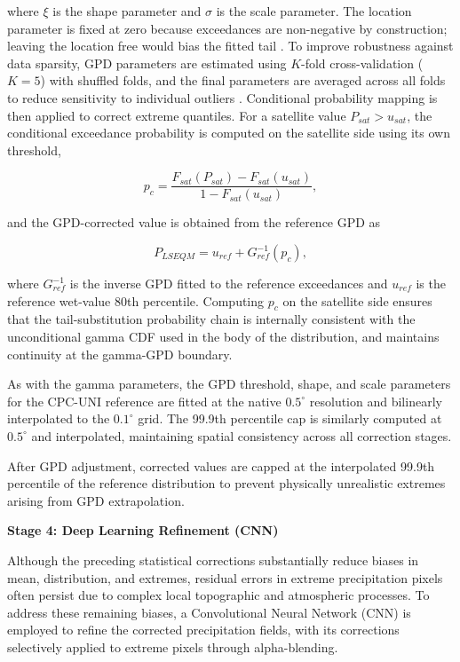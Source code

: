\documentclass[
]{article}
\begin{document}
where \(\xi\) is the shape parameter and \(\sigma\) is the scale
parameter. The location parameter is fixed at zero because exceedances
are non-negative by construction; leaving the location free would bias
the fitted tail \cite{ref7}. To improve robustness against data sparsity,
GPD parameters are estimated using \(K\)-fold cross-validation
(\(K = 5\)) with shuffled folds, and the final parameters are averaged
across all folds to reduce sensitivity to individual outliers \cite{ref25}.
Conditional probability mapping is then applied to correct extreme
quantiles. For a satellite value \(P_{sat} > u_{sat}\), the conditional
exceedance probability is computed on the satellite side using its own
threshold,

\[p_c = \frac{F_{sat}(P_{sat}) - F_{sat}(u_{sat})}{1 - F_{sat}(u_{sat})},\]

and the GPD-corrected value is obtained from the reference GPD as

\[P_{LSEQM} = u_{ref} + G_{ref}^{-1}(p_c),\]

where \(G_{ref}^{-1}\) is the inverse GPD fitted to the reference
exceedances and \(u_{ref}\) is the reference wet-value 80th percentile.
Computing \(p_c\) on the satellite side ensures that the
tail-substitution probability chain is internally consistent with the
unconditional gamma CDF used in the body of the distribution, and
maintains continuity at the gamma-GPD boundary.

As with the gamma parameters, the GPD threshold, shape, and scale
parameters for the CPC-UNI reference are fitted at the native
\(0.5^{\circ}\) resolution and bilinearly interpolated to the
\(0.1^{\circ}\) grid. The 99.9th percentile cap is similarly computed at
\(0.5^{\circ}\) and interpolated, maintaining spatial consistency across
all correction stages.

After GPD adjustment, corrected values are capped at the interpolated
99.9th percentile of the reference distribution to prevent physically
unrealistic extremes arising from GPD extrapolation.

\textbf{Stage 4: Deep Learning Refinement (CNN)}

Although the preceding statistical corrections substantially reduce
biases in mean, distribution, and extremes, residual errors in extreme
precipitation pixels often persist due to complex local topographic and
atmospheric processes. To address these remaining biases, a
Convolutional Neural Network (CNN) is employed to refine the corrected
precipitation fields, with its corrections selectively applied to
extreme pixels through alpha-blending.
\end{document}
